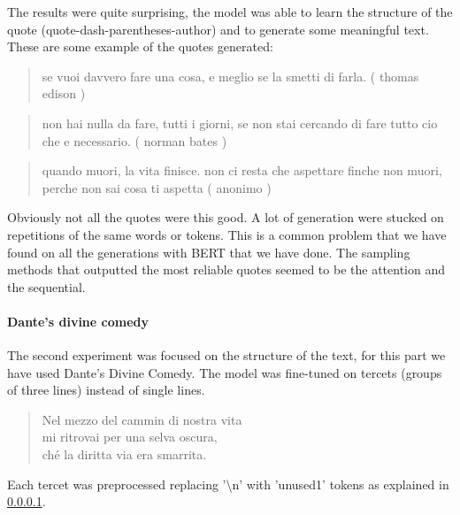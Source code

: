 \documentclass[10pt,twocolumn,letterpaper]{article}
\begin{document}
The results were quite surprising, the model was able to learn the structure of the quote (quote-dash-parentheses-author)
and to generate some meaningful text. These are some example of the quotes generated:

\begin{quote}
   se vuoi davvero fare una cosa, e meglio se la smetti di farla. ( thomas edison )
\end{quote}
\begin{quote}
non hai nulla da fare, tutti i giorni, se non stai cercando di fare tutto cio che e necessario. ( norman bates )
\end{quote}
\begin{quote}
   quando muori, la vita finisce. non ci resta che aspettare finche non muori, perche non sai cosa ti aspetta ( anonimo )
\end{quote}

Obviously not all the quotes were this good. A lot of generation were stucked on repetitions of the same words or tokens.
This is a common problem that we have found on all the generations with BERT that we have done.
The sampling methods that outputted the most reliable quotes seemed to be the attention and the sequential.

\paragraph{Dante's divine comedy} The second experiment was focused on the structure of the text,
for this part we have used Dante's Divine Comedy. The model was fine-tuned on tercets (groups of three lines) instead of single lines.
\begin{quote}
   Nel mezzo del cammin di nostra vita\\
   mi ritrovai per una selva oscura,\\
   ché la diritta via era smarrita.\\
\end{quote}
Each tercet was preprocessed replacing '\textbackslash n' with 'unused1' tokens as explained in \ref{}.

\end{document}
